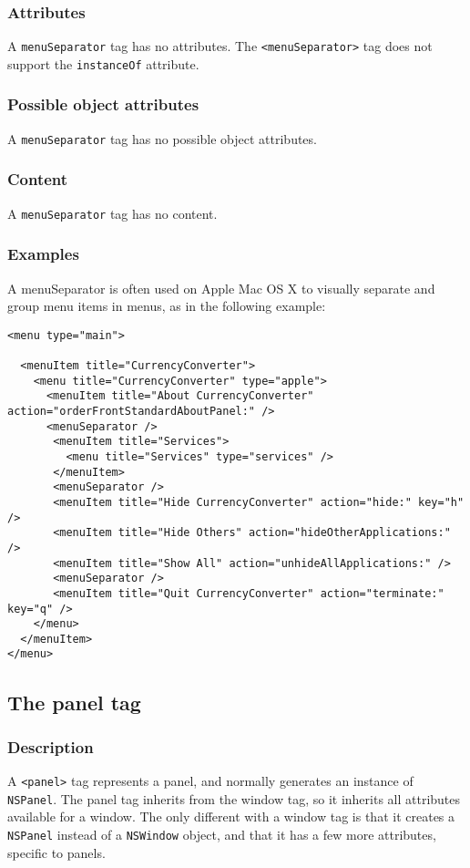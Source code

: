 \subsubsection{Attributes}
A \texttt{menuSeparator} tag has no attributes.  The
\texttt{<menuSeparator>} tag does not support the \texttt{instanceOf}
attribute.

\subsubsection{Possible object attributes}
A \texttt{menuSeparator} tag has no possible object attributes.

\subsubsection{Content}
A \texttt{menuSeparator} tag has no content.

\subsubsection{Examples}
A menuSeparator is often used on Apple Mac OS X to visually separate and
group menu items in menus, as in the following example:
\begin{verbatim}
<menu type="main">

  <menuItem title="CurrencyConverter">
    <menu title="CurrencyConverter" type="apple">
      <menuItem title="About CurrencyConverter" action="orderFrontStandardAboutPanel:" />
      <menuSeparator />
       <menuItem title="Services">
         <menu title="Services" type="services" />
       </menuItem>
       <menuSeparator />
       <menuItem title="Hide CurrencyConverter" action="hide:" key="h" />
       <menuItem title="Hide Others" action="hideOtherApplications:" />
       <menuItem title="Show All" action="unhideAllApplications:" />
       <menuSeparator />
       <menuItem title="Quit CurrencyConverter" action="terminate:" key="q" />
    </menu>
  </menuItem>
</menu>
\end{verbatim}

\subsection{The panel tag}

\subsubsection{Description}
A \texttt{<panel>} tag represents a panel, and normally generates an
instance of \texttt{NSPanel}.  The panel tag inherits from the window
tag, so it inherits all attributes available for a window.  The only
different with a window tag is that it creates a \texttt{NSPanel}
instead of a \texttt{NSWindow} object, and that it has a few more
attributes, specific to panels.

